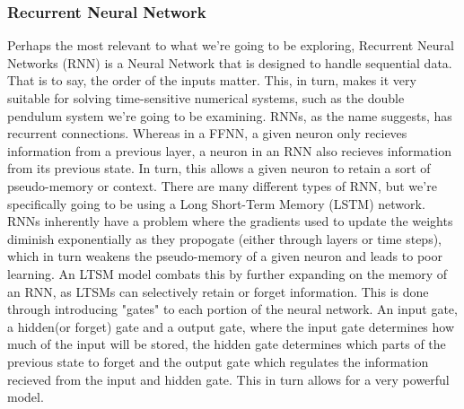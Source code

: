 \documentclass{article}
\begin{document}
\subsubsection{Recurrent Neural Network}
Perhaps the most relevant to what we're going to be exploring, Recurrent Neural Networks (RNN) is a Neural Network that is designed to handle sequential data. That is to say, the order of the inputs matter. This, in turn, makes it very suitable for solving time-sensitive numerical systems, such as the double pendulum system we're going to be examining. \newline
RNNs, as the name suggests, has recurrent connections. Whereas in a FFNN, a given neuron only recieves information from a previous layer, a neuron in an RNN also recieves information from its previous state. In turn, this allows a given neuron to retain a sort of pseudo-memory or context. \newline
There are many different types of RNN, but we're specifically going to be using a Long Short-Term Memory (LSTM) network. RNNs inherently have a problem where the gradients used to update the weights diminish exponentially as they propogate (either through layers or time steps), which in turn weakens the pseudo-memory of a given neuron and leads to poor learning. An LTSM model combats this by further expanding on the memory of an RNN, as LTSMs can selectively retain or forget information. This is done through introducing "gates" to each portion of the neural network. An input gate, a hidden(or forget) gate and a output gate, where the input gate determines how much of the input will be stored, the hidden gate determines which parts of the previous state to forget and the output gate which regulates the information recieved from the input and hidden gate. This in turn allows for a very powerful model.
\end{document}
